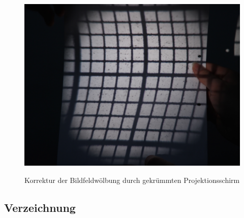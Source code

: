 \begin{figure}[htb]
	\includegraphics[width=\linewidth]{img/Bildwoelbung/Prakt_Linsenfehler_2015_06_04_076}
	\label{fig:bildwoelbung_korrigiert}
	\caption{Korrektur der Bildfeldwölbung durch gekrümmten Projektionsschirm}
\end{figure}

\subsection{Verzeichnung}

